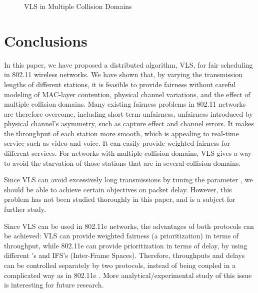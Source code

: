 \documentclass[letterpaper, 10 pt, conference]{ieeeconf}
\begin{document}
\begin{figure}
\noindent \begin{centering}
\par\end{centering}



\caption{\label{fig:VLS-in-Multiple}VLS in Multiple Collision Domains}
\end{figure}


\section{Conclusions}

In this paper, we have proposed a distributed algorithm, VLS, for
fair scheduling in 802.11 wireless networks. We have shown that, by
varying the transmission lengths of different stations, it is feasible
to provide fairness without careful modeling of MAC-layer contention,
physical channel variations, and the effect of multiple collision
domains. Many existing fairness problems in 802.11 networks are therefore
overcome, including short-term unfairness, unfairness introduced by
physical channel's asymmetry, such as capture effect and channel errors. 
It makes the throughput of each station more smooth, which is appealing to real-time service such as video and voice. It can easily provide weighted fairness for 
different services. For networks with multiple collision domains, VLS gives a way to avoid the starvation of those stations that are in several collision domains.

Since VLS can avoid excessively long transmissions by tuning the parameter
, we should be able to achieve certain objectives on packet delay.
However, this problem has not been studied thoroughly in this paper,
and is a subject for further study.

Since VLS can be used in 802.11e networks, the advantages of both 
protocols can be achieved: VLS can provide weighted fairness (a prioritization) in terms of throughput, while 802.11e can provide prioritization in terms of delay, by using different 's and IFS's (Inter-Frame Spaces). Therefore, throughputs and delays can be controlled separately by two protocols, instead of being coupled in a complicated way as in 802.11e \cite{Saturated_80211e}. More analytical/experimental study of this issue is interesting for future research.
\end{document}
